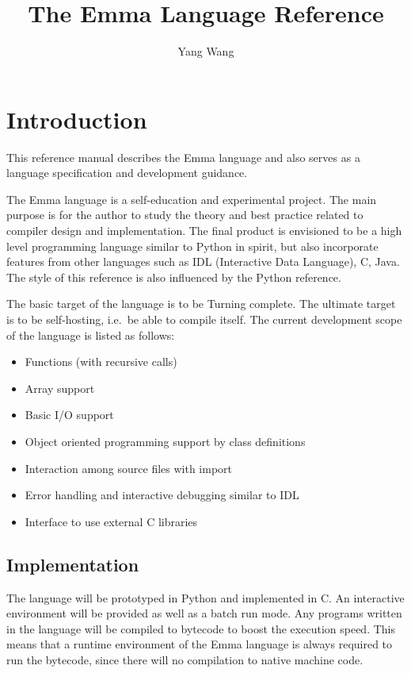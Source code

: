 \documentclass[10pt,a4paper]{article}
\author{Yang Wang}
\title{The Emma Language Reference}
\begin{document}

\section{Introduction}
This reference manual describes the Emma language and also serves as a  
language specification and development guidance.

The Emma language is a self-education and experimental project. 
The main purpose is for the author to study the theory and best practice related
to compiler design and implementation. 
The final product is envisioned to be a high level programming language similar
to Python in spirit, but also incorporate features from other languages such as
IDL (Interactive Data Language), C, Java. The style of this reference is also
influenced by the Python reference.

The basic target of the language is to be Turning complete. The ultimate
target is to be self-hosting, i.e.\ be able to compile itself.
The current development scope of the language is listed as follows:

\begin{itemize}
\item Functions (with recursive calls)
\item Array support
\item Basic I/O support
\item Object oriented programming support by class definitions
\item Interaction among source files with import
\item Error handling and interactive debugging similar to IDL
\item Interface to use external C libraries
\end{itemize}


\subsection{Implementation}
The language will be prototyped in Python and implemented in C. 
An interactive environment will be provided as well as a batch
run mode. Any programs written in the language will be compiled
to bytecode to boost the execution speed. This means
that a runtime environment of the Emma language is always required to run
the bytecode, since there will no compilation to native machine code.
\end{document}
